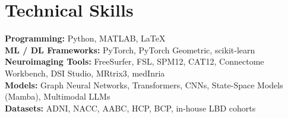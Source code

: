 \section{Technical Skills}
\textbf{Programming:} Python, MATLAB, \LaTeX \\
\textbf{ML / DL Frameworks:} PyTorch, PyTorch Geometric, scikit-learn \\
\textbf{Neuroimaging Tools:} FreeSurfer, FSL, SPM12, CAT12, Connectome Workbench,
DSI Studio, MRtrix3, medInria \\
\textbf{Models:} Graph Neural Networks, Transformers, CNNs, State-Space Models (Mamba),
Multimodal LLMs \\
\textbf{Datasets:} ADNI, NACC, AABC, HCP, BCP, in-house LBD cohorts
